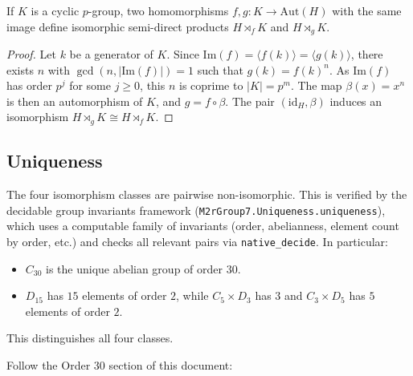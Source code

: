 \begin{lemma}\label{equal_image_iso_sdp}
If $K$ is a cyclic $p$-group, two homomorphisms $f, g : K \to \mathrm{Aut}(H)$
with the same image define isomorphic semi-direct products $H \rtimes_f K$ and
$H \rtimes_g K$.
\end{lemma}

\begin{proof}
Let $k$ be a generator of $K$. Since $\mathrm{Im}(f) = \langle f(k) \rangle =
\langle g(k) \rangle$, there exists $n$ with $\gcd(n, |\mathrm{Im}(f)|) = 1$
such that $g(k) = f(k)^n$. As $\mathrm{Im}(f)$ has order $p^j$ for some $j \geq 0$,
this $n$ is coprime to $|K| = p^m$. The map $\beta(x) = x^n$ is then an
automorphism of $K$, and $g = f \circ \beta$. The pair $(\mathrm{id}_H, \beta)$
induces an isomorphism $H \rtimes_g K \cong H \rtimes_f K$.
\end{proof}

\subsection{Uniqueness}

The four isomorphism classes are pairwise non-isomorphic. This is verified by
the decidable group invariants framework
(\verb|M2rGroup7.Uniqueness.uniqueness|), which uses a computable family of
invariants (order, abelianness, element count by order, etc.) and checks all
relevant pairs via \verb|native_decide|. In particular:
\begin{itemize}
  \item $C_{30}$ is the unique abelian group of order $30$.
  \item $D_{15}$ has $15$ elements of order $2$, while $C_5 \times D_3$ has
        $3$ and $C_3 \times D_5$ has $5$ elements of order $2$.
\end{itemize}
This distinguishes all four classes.




Follow the Order 30 section of this document:

%
\documentclass[a4paper,11pt, titlepage]{article}

